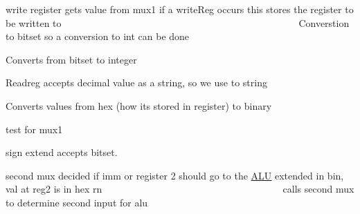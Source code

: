 write register gets value from mux1 if a write\+Reg occurs this stores the register to be written to ~\newline
~\newline
~\newline
~\newline
~\newline
~\newline
~\newline
~\newline
~\newline
~\newline
~\newline
~\newline
~\newline
~\newline
~\newline
~\newline
~\newline
~\newline
~\newline
~\newline
~\newline
~\newline
~\newline
~\newline
~\newline
~\newline
~\newline
~\newline
~\newline
 Converstion to bitset so a conversion to int can be done

Converts from bitset to integer

Readreg accepts decimal value as a string, so we use to string

Converts values from hex (how its stored in register) to binary

test for mux1

sign extend accepts bitset.

second mux decided if imm or register 2 should go to the \mbox{\hyperlink{class_a_l_u}{A\+LU}} extended in bin, val at reg2 is in hex rn ~\newline
~\newline
~\newline
~\newline
~\newline
~\newline
~\newline
~\newline
~\newline
~\newline
~\newline
~\newline
~\newline
~\newline
~\newline
~\newline
~\newline
~\newline
~\newline
~\newline
~\newline
~\newline
 calls second mux to determine second input for alu

